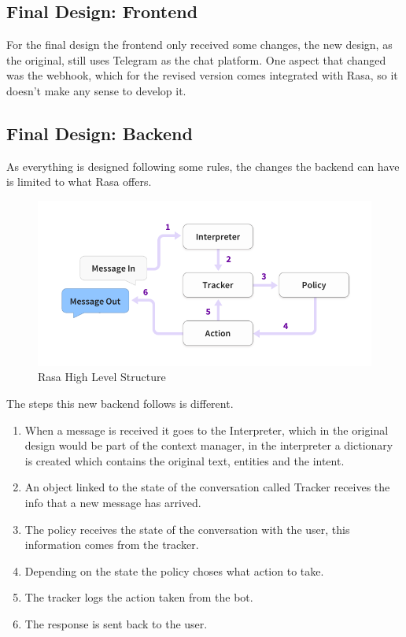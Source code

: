 \subsection{Final Design: Frontend}\label{sec:chap4_fin_des_fron}

For the final design the frontend only received some changes, the new design, as the original, still uses Telegram as the chat platform. One aspect that changed was the webhook, which for the revised version comes integrated with Rasa, so it doesn’t make any sense to develop it.

\subsection{Final Design: Backend}\label{sec:chap4_fin_des_fron}

As everything is designed following some rules, the changes the backend can have is limited to what Rasa offers.

\begin{center}
	\begin{figure}[h!]
		\centering
		\includegraphics[scale=0.65]{./images/4-rasa-message-processing}
		\caption{Rasa High Level Structure}
		\label{4_rasa_message_processing}
	\end{figure}
\end{center}

The steps this new backend follows is different.

\begin{enumerate}
	\item {When a message is received it goes to the Interpreter, which in the original design would be part of the context manager, in the interpreter a dictionary is created which contains the original text, entities and the intent.}
	\item {An object linked to the state of the conversation called Tracker receives the info that a new message has arrived.}
	\item {The policy receives the state of the conversation with the user, this information comes from the tracker.}
	\item {Depending on the state the policy choses what action to take.}
	\item {The tracker logs the action taken from the bot.}
	\item {The response is sent back to the user.\cite{rasa-arch}}
\end{enumerate}

